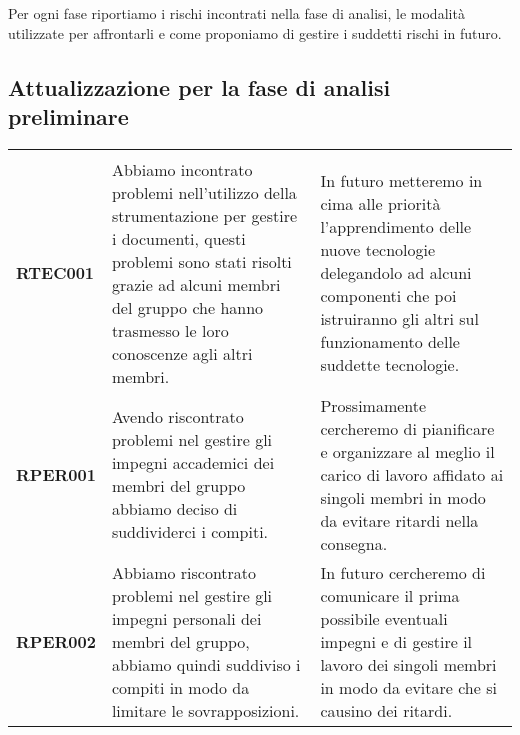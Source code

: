 \documentclass[../piano-di-progetto]{subfiles}
\begin{document}
Per ogni fase riportiamo i rischi incontrati nella fase di analisi, le modalità utilizzate per affrontarli e come proponiamo di gestire i suddetti rischi in futuro.

\subsection{Attualizzazione per la fase di analisi preliminare}%
\label{sub:attualizzazione_fase_analisi_preliminare}
\begin{longtable}[H]{|p{10em}|p{17em}|p{17em}|}
  \rowcolor{darkgray!90!}
  \multicolumn{1}{c}{\color{white}{\textbf{Rischio}}} & \multicolumn{1}{c}{\color{white}{\textbf{Gestione}}}                                                                                                                                                                    & \multicolumn{1}{c}{\color{white}{\textbf{Monitoraggio}}}                                                                                                                                     \\
  \textbf{RTEC001}                                    & Abbiamo incontrato problemi nell'utilizzo della strumentazione per gestire i documenti, questi problemi sono stati risolti grazie ad alcuni membri del gruppo che hanno trasmesso le loro conoscenze agli altri membri. & In futuro metteremo in cima alle priorità l'apprendimento delle nuove tecnologie delegandolo ad alcuni componenti che poi istruiranno gli altri sul funzionamento delle suddette tecnologie. \\
  \textbf{RPER001}                                    & Avendo riscontrato problemi nel gestire gli impegni accademici dei membri del gruppo abbiamo deciso di suddividerci i compiti.                                                                                          & Prossimamente cercheremo di pianificare e organizzare al meglio il carico di lavoro affidato ai singoli membri in modo da evitare ritardi nella consegna.                                    \\
  \textbf{RPER002}                                    & Abbiamo riscontrato problemi nel gestire gli impegni personali dei membri del gruppo, abbiamo quindi suddiviso i compiti in modo da limitare le sovrapposizioni.                                                        & In futuro cercheremo di comunicare il prima possibile eventuali impegni e di gestire il lavoro dei singoli membri in modo da evitare che si causino dei ritardi.                             \\

\end{longtable}
\end{document}
